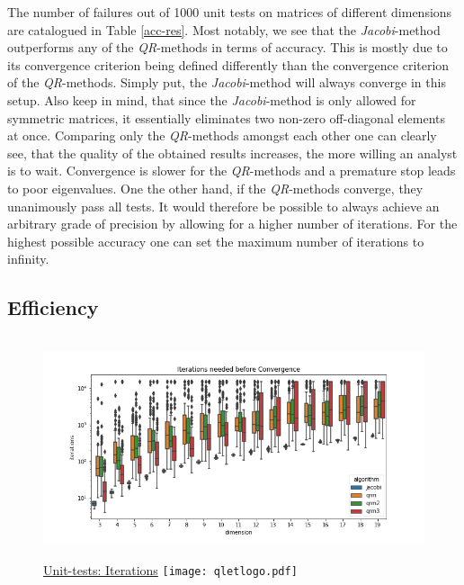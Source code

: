 \documentclass[12pt]{article}
\begin{document}
The number of failures out of 1000 unit tests on matrices of different dimensions are catalogued in Table \ref{acc-res}. Most notably, we see that the \textit{Jacobi}-method outperforms any of the \textit{QR}-methods in terms of accuracy. This is mostly due to its convergence criterion being defined differently than the convergence criterion of the \textit{QR}-methods. Simply put, the \textit{Jacobi}-method will always converge in this setup. Also keep in mind, that since the \textit{Jacobi}-method is only allowed for symmetric matrices, it essentially eliminates two non-zero off-diagonal elements at once. Comparing only the \textit{QR}-methods amongst each other one can clearly see, that the quality of the obtained results increases, the more willing an analyst is to wait. Convergence is slower for the \textit{QR}-methods and a premature stop leads to poor eigenvalues. One the other hand, if the \textit{QR}-methods converge, they unanimously pass all tests. It would therefore be possible to always achieve an arbitrary grade of precision by allowing for a higher number of iterations. For the highest possible accuracy one can set the maximum number of iterations to infinity.

\subsection{Efficiency}


\begin{figure}
\centering
\caption{\href {https://github.com/thsis/NIS18/blob/master/tests/tests_eigen.py}{Unit-tests: Iterations}  \protect\texttt{[image: qletlogo.pdf]}}
  \label{algo_efficiency}
  \includegraphics[width=\textwidth, height=6.5cm]{../media/plots/iterations_boxplot.png}
\end{figure}
\end{document}
